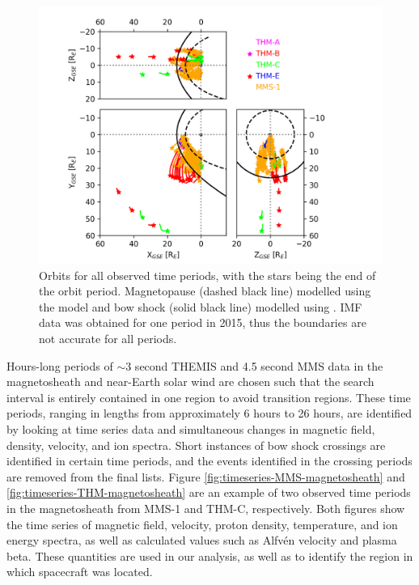 \begin{figure}
    \centering
    \includegraphics[width=\textwidth]{Figures/Orbits/all_TE_orbits_xy_xz_yz.png}
    \caption[Orbits for all observed time periods]{Orbits for all observed time periods, with the stars being the end of the orbit period. Magnetopause (dashed black line) modelled using the \cite{Shue:1997} model and bow shock (solid black line) modelled using \cite{SlavinHolzer:1984}. IMF data was obtained for one period in 2015, thus the boundaries are not accurate for all periods.}
    \label{fig:orbits-all}
\end{figure}

Hours-long periods of $\sim$3 second THEMIS and 4.5 second MMS data in the magnetosheath and near-Earth solar wind are chosen such that the search interval is entirely contained in one region to avoid transition regions. These time periods, ranging in lengths from approximately 6 hours to 26 hours, are identified by looking at time series data and simultaneous changes in magnetic field, density, velocity, and ion spectra. Short instances of bow shock crossings are identified in certain time periods, and the events identified in the crossing periods are removed from the final lists. Figure \ref{fig:timeseries-MMS-magnetosheath} and \ref{fig:timeseries-THM-magnetosheath} are an example of two observed time periods in the magnetosheath from MMS-1 and THM-C, respectively. Both figures show the time series of magnetic field, velocity, proton density, temperature, and ion energy spectra, as well as calculated values such as Alfv\'en velocity and plasma beta. These quantities are used in our analysis, as well as to identify the region in which spacecraft was located.

